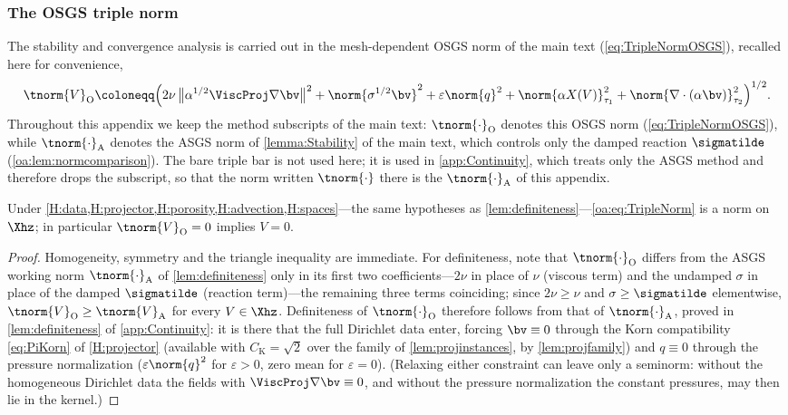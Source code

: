 \subsubsection{The OSGS triple norm}
\label{oa:sec:norm}

The stability and convergence analysis is carried out in the mesh-dependent OSGS norm of the
main text (\cref{eq:TripleNormOSGS}), recalled here for convenience,
\begin{equation}
  \label{oa:eq:TripleNorm}
  \tnorm{V}_{\mathrm O}
  \coloneqq
  \Bigl(
  2\nu\,\bigl\lVert \alpha^{1/2}\ViscProj\nabla\bv \bigr\rVert^2
  + \norm{\sigma^{1/2}\bv}^2
  + \varepsilon\norm{q}^2
  + \norm{\alpha X(V)}_{\tau_1}^2
  + \norm{\nabla\cdot(\alpha\bv)}_{\tau_2}^2
  \Bigr)^{1/2}.
\end{equation}
Throughout this appendix we keep the method subscripts of the main text:
$\tnorm{\cdot}_{\mathrm O}$ denotes this OSGS norm (\cref{eq:TripleNormOSGS}), while
$\tnorm{\cdot}_{\mathrm A}$ denotes the ASGS norm of \cref{lemma:Stability} of the main text,
which controls only the damped reaction $\sigmatilde$ (\cref{oa:lem:normcomparison}). The bare
triple bar is not used here; it is used in \cref{app:Continuity}, which treats only the ASGS
method and therefore drops the subscript, so that the norm written $\tnorm{\cdot}$ there is the
$\tnorm{\cdot}_{\mathrm A}$ of this appendix.

\begin{lemma}[Definiteness]
\label{oa:lem:definiteness}
Under \cref{H:data,H:projector,H:porosity,H:advection,H:spaces}---the same hypotheses as \cref{lem:definiteness}---\cref{oa:eq:TripleNorm} is a
norm on $\Xhz$; in particular $\tnorm{V}_{\mathrm{O}} = 0$ implies $V = 0$.
\end{lemma}

\begin{proof}
Homogeneity, symmetry and the triangle inequality are immediate. For definiteness, note that
$\tnorm{\cdot}_{\mathrm{O}}$ differs from the ASGS working norm $\tnorm{\cdot}_{\mathrm{A}}$ of
\cref{lem:definiteness} only in its first two coefficients---$2\nu$ in place of $\nu$ (viscous term) and
the undamped $\sigma$ in place of the damped $\sigmatilde$ (reaction term)---the remaining three terms
coinciding; since $2\nu \ge \nu$ and $\sigma \ge \sigmatilde$ elementwise, $\tnorm{V}_{\mathrm{O}} \ge
\tnorm{V}_{\mathrm{A}}$ for every $V \in \Xhz$. Definiteness of $\tnorm{\cdot}_{\mathrm{O}}$ therefore
follows from that of $\tnorm{\cdot}_{\mathrm{A}}$, proved in \cref{lem:definiteness} of \cref{app:Continuity}:
it is there that the full Dirichlet data enter, forcing $\bv \equiv 0$ through the Korn
compatibility \cref{eq:PiKorn} of \cref{H:projector} (available with $C_{\mathrm{K}} = \sqrt2$
over the family of \cref{lem:projinstances}, by \cref{lem:projfamily}) and $q \equiv 0$
through the pressure normalization
($\varepsilon\norm{q}^2$ for $\varepsilon > 0$, zero mean for $\varepsilon = 0$). (Relaxing either constraint can leave only a seminorm: without the homogeneous
Dirichlet data the fields with $\ViscProj\nabla\bv\equiv0$, and without the pressure normalization
the constant pressures, may then lie in the kernel.)
\end{proof}

